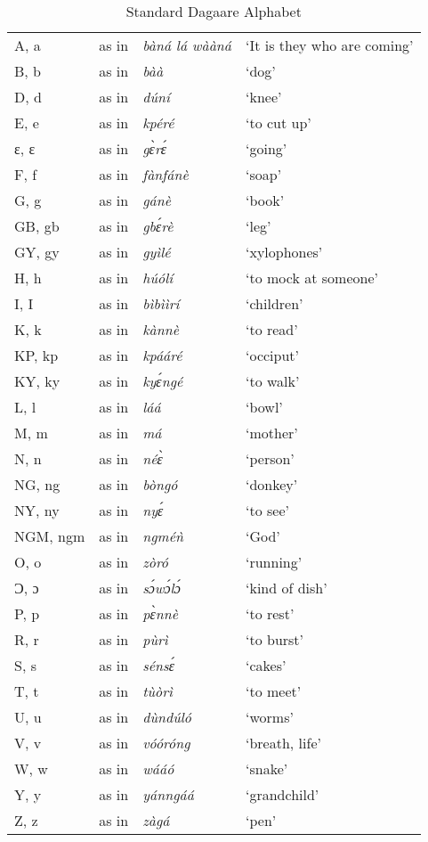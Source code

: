 \begin{table}[t]
\begin{tabular}{llll}
A, a   & as in &  \textit{bàná lá wààná} &  ‘It is they who are coming’\\
B, b & as in & \textit{bàà} &  ‘dog’ \\ 
D, d & as in &  \textit{dúní} &  ‘knee’ \\ 
E, e & as in &  \textit{kpéré} &  ‘to cut up’\\ 
ɛ, ɛ & as in & \textit{gɛ̀rɛ́} &  ‘going’ \\ 
F, f & as in & \textit{fànfánè} &  ‘soap’ \\ 
G, g & as in & \textit{gánè} &  ‘book’ \\ 
GB, gb & as in &  \textit{gbɛ́rè} &  ‘leg’ \\ 
GY, gy & as in &  \textit{gyìlé} &  ‘xylophones’ \\ 
H, h & as in &  \textit{húólí} &  ‘to mock at someone’ \\ 
I, I & as in &  \textit{bìbììrí} &  ‘children’ \\ 
K, k & as in &  \textit{kànnè} &  ‘to read’ \\ 
KP, kp & as in & \textit{kpááré} &  ‘occiput’ \\ 
KY, ky & as in &  \textit{kyɛ́ngé} &  ‘to walk’ \\ 
L, l & as in & \textit{láá} &  ‘bowl’ \\ 
M, m & as in &  \textit{má} &  ‘mother’ \\ 
N, n & as in &  \textit{néɛ̀} &  ‘person’ \\ 
NG, ng & as in &  \textit{bòngó} &  ‘donkey’ \\ 
NY, ny & as in & \textit{nyɛ́} &  ‘to see’ \\ 
NGM, ngm & as in &  \textit{ngméǹ} &  ‘God’ \\ 
O, o & as in &  \textit{zòró} &  ‘running’\\ 
Ɔ, ɔ & as in &  \textit{sɔ́wɔ́lɔ́} &  ‘kind of dish’ \\ 
P, p & as in &  \textit{pɛ̀nnè} &  ‘to rest’ \\ 
R, r & as in &  \textit{pùrì} &  ‘to burst’ \\ 
S, s & as in &  \textit{sénsɛ́} &  ‘cakes’ \\ 
T, t & as in &  \textit{tùòrì} &  ‘to meet’ \\ 
U, u & as in &  \textit{dùndúló} &  ‘worms’ \\ 
V, v & as in &  \textit{vóóróng} &  ‘breath, life’ \\ 
W, w & as in &  \textit{wááó} &  ‘snake’ \\ 
Y, y & as in &  \textit{yánngáá} &  ‘grandchild’ \\ 
Z, z & as in &  \textit{zàgá} &  ‘pen’ \\ 
\end{tabular}
\caption{{Standard Dagaare Alphabet}}\label{tab:DagaareAlphabet}
\end{table}

